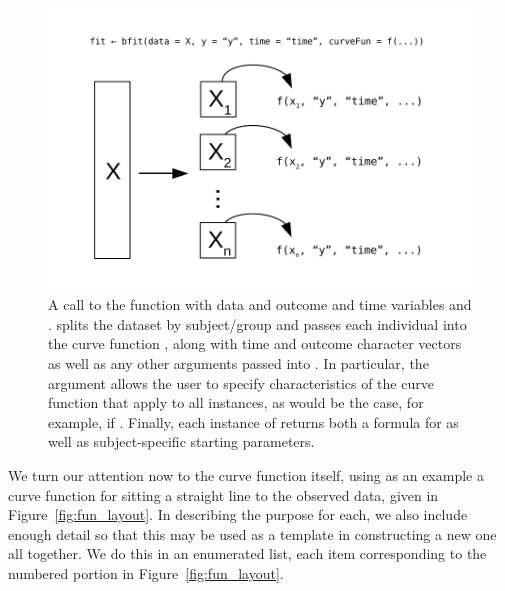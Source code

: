 \begin{figure}
\centering
\includegraphics{img/curve_split.pdf}
\caption{A call to the function  with data  and outcome and time variables  and .  splits the dataset  by subject/group and passes each individual  into the curve function , along with time and outcome character vectors as well as any other arguments passed into . In particular, the  argument allows the user to specify characteristics of the curve function that apply to all instances, as would be the case, for example, if . Finally, each instance of  returns both a formula for  as well as subject-specific starting parameters.}
\label{fig:curve_split}
\end{figure}

We turn our attention now to the curve function itself, using as an example a curve function for sitting a straight line to the observed data, given in Figure~\ref{fig:fun_layout}. In describing the purpose for each, we also include enough detail so that this may be used as a template in constructing a new one all together. We do this in an enumerated list, each item corresponding to the numbered portion in Figure~\ref{fig:fun_layout}.

